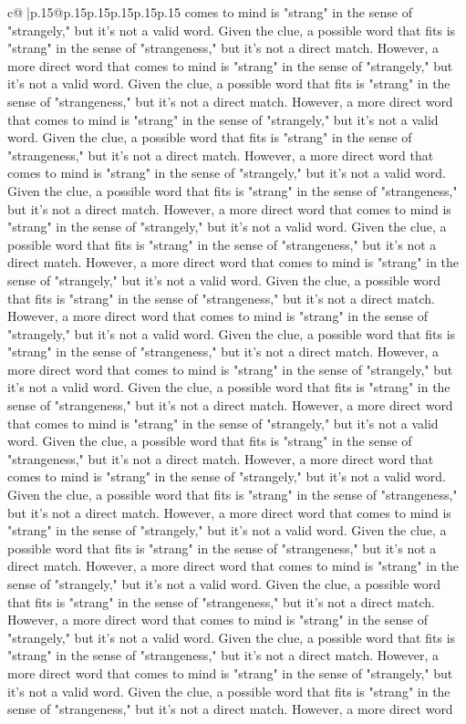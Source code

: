 \documentclass{article}
\begin{document}
{\begin{supertabular}{c@{$\;$}|p{.15\linewidth}@{}p{.15\linewidth}p{.15\linewidth}p{.15\linewidth}p{.15\linewidth}p{.15\linewidth}}
{{{comes to mind is "strang" in the sense of "strangely," but it's not a valid word. Given the clue, a possible word that fits is "strang" in the sense of "strangeness," but it's not a direct match. However, a more direct word that comes to mind is "strang" in the sense of "strangely," but it's not a valid word. Given the clue, a possible word that fits is "strang" in the sense of "strangeness," but it's not a direct match. However, a more direct word that comes to mind is "strang" in the sense of "strangely," but it's not a valid word. Given the clue, a possible word that fits is "strang" in the sense of "strangeness," but it's not a direct match. However, a more direct word that comes to mind is "strang" in the sense of "strangely," but it's not a valid word. Given the clue, a possible word that fits is "strang" in the sense of "strangeness," but it's not a direct match. However, a more direct word that comes to mind is "strang" in the sense of "strangely," but it's not a valid word. Given the clue, a possible word that fits is "strang" in the sense of "strangeness," but it's not a direct match. However, a more direct word that comes to mind is "strang" in the sense of "strangely," but it's not a valid word. Given the clue, a possible word that fits is "strang" in the sense of "strangeness," but it's not a direct match. However, a more direct word that comes to mind is "strang" in the sense of "strangely," but it's not a valid word. Given the clue, a possible word that fits is "strang" in the sense of "strangeness," but it's not a direct match. However, a more direct word that comes to mind is "strang" in the sense of "strangely," but it's not a valid word. Given the clue, a possible word that fits is "strang" in the sense of "strangeness," but it's not a direct match. However, a more direct word that comes to mind is "strang" in the sense of "strangely," but it's not a valid word. Given the clue, a possible word that fits is "strang" in the sense of "strangeness," but it's not a direct match. However, a more direct word that comes to mind is "strang" in the sense of "strangely," but it's not a valid word. Given the clue, a possible word that fits is "strang" in the sense of "strangeness," but it's not a direct match. However, a more direct word that comes to mind is "strang" in the sense of "strangely," but it's not a valid word. Given the clue, a possible word that fits is "strang" in the sense of "strangeness," but it's not a direct match. However, a more direct word that comes to mind is "strang" in the sense of "strangely," but it's not a valid word. Given the clue, a possible word that fits is "strang" in the sense of "strangeness," but it's not a direct match. However, a more direct word that comes to mind is "strang" in the sense of "strangely," but it's not a valid word. Given the clue, a possible word that fits is "strang" in the sense of "strangeness," but it's not a direct match. However, a more direct word that comes to mind is "strang" in the sense of "strangely," but it's not a valid word. Given the clue, a possible word that fits is "strang" in the sense of "strangeness," but it's not a direct match. However, a more direct word }}}
\end{supertabular}}
\end{document}
